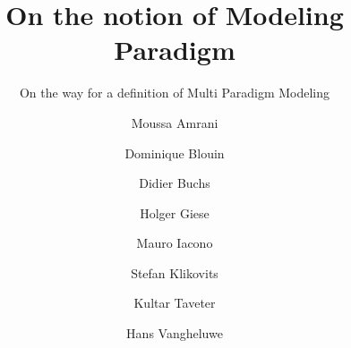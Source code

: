 \documentclass[smallcondensed]{svjour3}     %
\begin{document}
\title{On the notion of Modeling Paradigm%
}
\subtitle{On the way for a definition of Multi Paradigm Modeling}


\author{
        Moussa Amrani \and
        Dominique Blouin \and
        Didier Buchs \and
        Holger Giese \and
        Mauro Iacono \and
        Stefan Klikovits \and
        Kultar Taveter \and
        Hans Vangheluwe %
}

\end{document}
